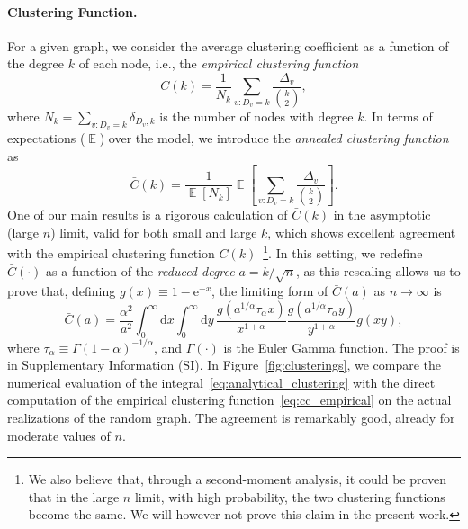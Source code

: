 \documentclass[ twocolumn,
 amsmath,amssymb,
 aps, pre, amsthm, amsfonts,
]{revtex4-2}
\DeclareMathOperator{\EX}{\mathbb{E}}%
\newcommand{\e}{\mathrm{e}}
\begin{document}
\paragraph*{Clustering Function.}
For a given graph, we consider the average clustering coefficient as a function of the degree $k$ of each node, i.e., the \emph{empirical clustering function}
\begin{equation} 
C(k) = \frac{1}{N_{k}} \sum_{v\colon D_v = k} \frac{\Delta_v}{\binom{k}{2}},
\label{eq:cc_empirical}
\end{equation}
where $N_k = \sum_{v\colon D_v = k} \delta_{D_v,k}$ is the number of nodes with degree $k$. In terms of expectations ($\EX$) over the model, we introduce the {\em annealed clustering function} as
\begin{equation}
    \bar{C}(k) = \frac{1}{\EX[N_k]} \EX \left[ \sum_{v\colon D_v = k} \frac{\Delta_v}{\binom{k}{2}} \right]. \label{eq:cc_annealed}
\end{equation}
One of our main results is a rigorous calculation of $\bar{C}(k)$ in the asymptotic (large $n$) limit, valid for both small and large $k$, which shows excellent agreement with the empirical clustering function $C(k)$~\footnote{We also believe that, through a second-moment analysis, it could be proven that in the large $n$ limit, with high probability, the two clustering functions become the same. We will however not prove this claim in the present work.}. 
In this setting, we redefine $\bar{C}(\cdot)$ as a function of the \textit{reduced degree} $a = {k}/{\sqrt{n}}$, as this rescaling allows us to prove that, defining $g(x)\equiv 1-\e^{-x}$, the limiting form of $\bar{C}(a)$ as $n \to \infty$ is %
\begin{equation}
    \bar{C}(a) = \frac{\alpha^2}{a^2}\! \int_{0}^\infty \!\!\!\!\!{\mathrm d}x
    \int_{0}^\infty  \!\!\!\!\!{\mathrm d}y\,\frac{g(a^{1/\alpha} {\tau_\alpha}x)}{x^{1+\alpha}}
    \frac{g(a^{1/\alpha} {\tau_\alpha}y)}{y^{1+\alpha}} g(x y), 
    \label{eq:analytical_clustering}
\end{equation}
where ${\tau_\alpha} \equiv \Gamma(1-\alpha)^{-1/\alpha}$, and $\Gamma(\cdot)$ is the Euler Gamma function. The proof is in Supplementary Information (SI). In Figure~\ref{fig:clusterings}, we compare the numerical evaluation of the integral~\eqref{eq:analytical_clustering} with the direct computation of the empirical clustering function~\eqref{eq:cc_empirical} on the actual realizations of the random graph. The agreement is remarkably good, already for moderate values of $n$. 
\end{document}
